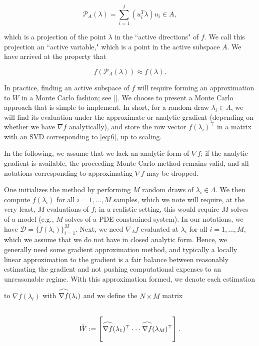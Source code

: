 \documentclass{amsart}
\newcommand\reallywidehat[1]{\arraycolsep=0pt\relax%
\begin{array}{c}
\stretchto{
  \scaleto{
    \scalerel*[\widthof{\ensuremath{#1}}]{\kern-.5pt\bigwedge\kern-.5pt}
    {\rule[-\textheight/2]{1ex}{\textheight}} %
  }{\textheight} %
}{0.5ex}\\           %
#1\\                 %
\rule{-1ex}{0ex}
\end{array}
}
\begin{document}
\begin{equation} \label{eq:8}
  \mathcal{P}_A(\lambda)=\sum_{i=1}^{j}\left( u_i^T \lambda\right)u_i \in A, 
\end{equation}

\noindent which is a projection of the point $\lambda$ in the ``active directions" of $f$. We call this projection an ``active variable," which is a point in the active subspace $A$. We have arrived at the property that 

\begin{equation} \label{eq:9}
f\left(\mathcal{P}_A(\lambda)\right) \approx f(\lambda).
\end{equation}

In practice, finding an active subspace of $f$ will require forming an approximation to $W$ in a Monte Carlo fashion; see []. We choose to present a Monte Carlo approach that is simple to implement. In short, for a random draw $\lambda_i \in \Lambda$, we will find its evaluation under the approximate or analytic gradient (depending on whether we have $\nabla f$ analytically), and store the row vector $f(\lambda_i)^\top$ in a matrix with an SVD corresponding to \eqref{eq:6}, up to scaling.

In the following, we assume that we lack an analytic form of $\nabla f$; if the analytic gradient is available, the proceeding Monte Carlo method remains valid, and all notations corresponding to approximating $\nabla f$ may be dropped.

One initializes the method by performing $M$ random draws of $\lambda_i \in \Lambda$. We then compute $f(\lambda_i)$ for all $i=1,\ldots,M$ samples, which we note will require, at the very least, $M$ evaluations of $f$; in a realistic setting, this would require $M$ solves of a model (e.g., $M$ solves of a PDE constrained system). In our notations, we have $\mathcal{D}=\{f(\lambda_i)\}_{i=1}^M$. Next, we need $\nabla_\Lambda f$ evaluated at $\lambda_i$ for all $i=1,\ldots,M$, which we assume that we do not have in closed analytic form. Hence, we generally need some gradient approximation method, and typically a locally linear approximation to the gradient is a fair balance between reasonably estimating the gradient and not pushing computational expenses to an unreasonable regime. With this approximation formed, we denote each estimation to $\nabla f(\lambda_i)$ with $\reallywidehat{\nabla f}(\lambda_i)$ and we define the $N \times M$ matrix

\begin{equation} \label{eq:10}
\tilde{W}:=\begin{bmatrix}
\reallywidehat{\nabla f}(\lambda_1)^\top
\cdot \cdot \cdot
\reallywidehat{\nabla f}(\lambda_M)^\top\\
\end{bmatrix}.
\end{equation}  
\end{document}
